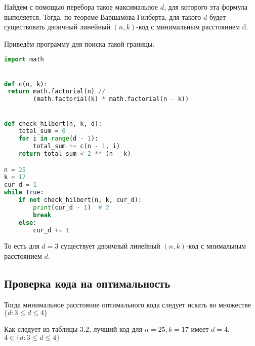 \documentclass{article}
\begin{document}
	 Найдём с помощью перебора такое максимальное $d$, для которого эта формула выполяется. Тогда, по теореме Варшамова-Гилберта, для такого $d$ будет существовать двоичный линейный $(n, k)$-код с минимальным расстоянием d.
	 
	 Приведём программу для поиска такой границы.
	 
	 \begin{lstlisting}[language=python]
import math


def c(n, k):
 return math.factorial(n) // 
	 	(math.factorial(k) * math.factorial(n - k))	


def check_hilbert(n, k, d):
	total_sum = 0
	for i in range(d - 1):
		total_sum += c(n - 1, i)
	return total_sum < 2 ** (n - k)

n = 25
k = 17
cur_d = 1
while True:
	if not check_hilbert(n, k, cur_d):
		print(cur_d - 1)  # 3
		break
	else:
		cur_d += 1
	 \end{lstlisting}
	 
	 То есть для $d = 3$ существует двоичный линейный $(n, k)$-код с мнимальным расстоянием $d$.
	 
	 \subsection{Проверка кода на оптимальность}
	 Тогда минимальное расстояние оптимального кода следует искать во множестве $\{d: 3 \leq d \leq 4\}$

	 Как следует из таблицы $3.2$, лучший код для $n = 25, k = 17$ имеет $d = 4$, $4 \in \{d: 3 \leq d \leq 4\}$
	 
\end{document}
